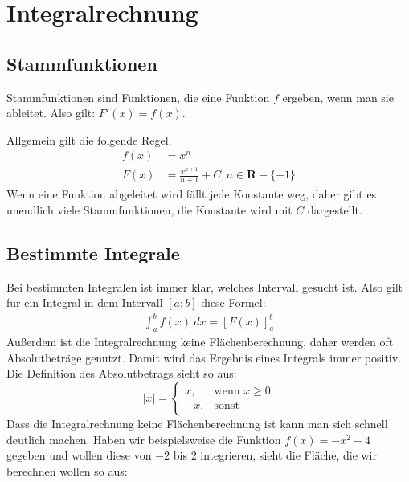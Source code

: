 \chapter{Integralrechnung}

\section{Stammfunktionen}

\begin{flushleft}
    Stammfunktionen sind Funktionen, die eine Funktion $f$ ergeben, wenn man sie ableitet.
    Also gilt: $F'(x)=f(x)$.

    Allgemein gilt die folgende Regel.
    \begin{align}
        f(x)&=x^n \\
        F(x)&=\frac{x^{n+1}}{n+1}+C, n \in \mathbf{R} - \{-1\}
    \end{align}
    Wenn eine Funktion abgeleitet wird fällt jede Konstante weg, daher gibt es unendlich viele Stammfunktionen, die Konstante wird mit $C$ dargestellt.
\end{flushleft}

\section{Bestimmte Integrale}

\begin{flushleft}
    Bei bestimmten Integralen ist immer klar, welches Intervall gesucht ist.
    Also gilt für ein Integral in dem Intervall $[a;b]$ diese Formel:
    \begin{align}
        \int_{a}^{b} f(x) \ dx = [F(x)]_{a}^{b}
    \end{align}
    Außerdem ist die Integralrechnung keine Flächenberechnung, daher werden oft Absolutbeträge genutzt. Damit wird das Ergebnis eines Integrals immer positiv.
    Die Definition des Absolutbetrags sieht so aus:
    \[
        \left | x \right | =
        \begin{cases}
            x, &\text{wenn } x \geq 0 \\
            -x, &\text{sonst}
        \end{cases}
    \]
    Dass die Integralrechnung keine Flächenberechnung ist kann man sich schnell deutlich machen.
    Haben wir beispielsweise die Funktion $f(x)=-x^2+4$ gegeben und wollen diese von $-2$ bis $2$ integrieren, sieht die Fläche, die wir berechnen wollen so aus:
\end{flushleft}


